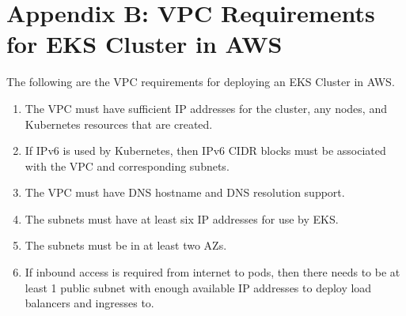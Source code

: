 \chapter{Appendix B: VPC Requirements for EKS Cluster in AWS}
\label{appendix:eks-vpc-requirements}

The following are the VPC requirements for deploying an EKS Cluster in AWS.
\vspace{-1em}
\begin{enumerate}
    \item The VPC must have sufficient IP addresses for the cluster, any nodes, and Kubernetes resources that are created.
    \item If IPv6 is used by Kubernetes, then IPv6 CIDR blocks must be associated with the VPC and corresponding subnets.
    \item The VPC must have DNS hostname and DNS resolution support.
    \item The subnets must have at least six IP addresses for use by EKS.
    \item The subnets must be in at least two AZs.
    \item If inbound access is required from internet to pods, then there needs to be at least 1 public subnet with enough available IP addresses to deploy load balancers and ingresses to. 
    
\end{enumerate}



